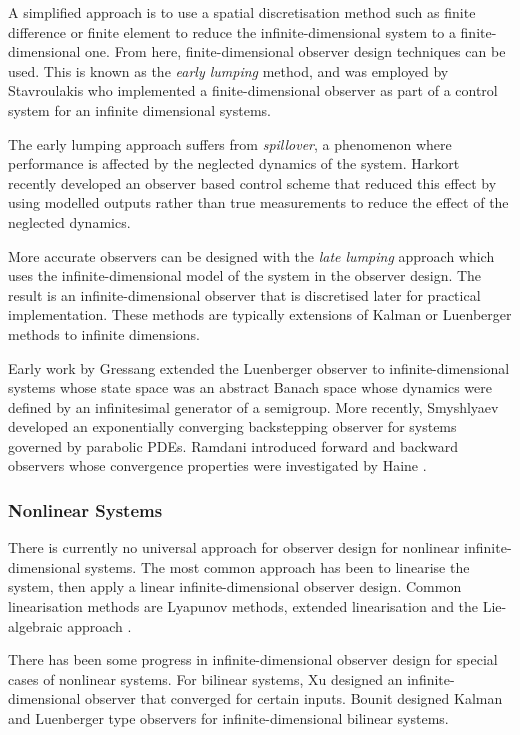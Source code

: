 A simplified approach is to use a spatial discretisation method such as finite difference or finite element to reduce the infinite-dimensional system to a finite-dimensional one. From here, finite-dimensional observer design techniques can be used. This is known as the \textit{early lumping} method, and was employed by Stavroulakis \cite{stavroulakis1973design} who implemented a finite-dimensional observer as part of a control system for an infinite dimensional systems.

The early lumping approach suffers from \textit{spillover}, a phenomenon where performance is affected by the neglected dynamics of the system\cite{meirovitch1983problem}. Harkort \cite{harkort2011finite} recently developed an observer based control scheme that reduced this effect by using modelled outputs rather than true measurements to reduce the effect of the neglected dynamics.

More accurate observers can be designed with the \textit{late lumping} approach which uses the infinite-dimensional model of the system in the observer design. The result is an infinite-dimensional observer that is discretised later for practical implementation. These methods are typically extensions of Kalman or Luenberger methods to infinite dimensions. 

Early work by Gressang \cite{gressang1975observers} extended the Luenberger observer to infinite-dimensional systems whose state space was an abstract Banach space whose dynamics were defined by an infinitesimal generator of a semigroup. More recently, Smyshlyaev \cite{smyshlyaev2005backstepping} developed an exponentially converging backstepping observer for systems governed by parabolic PDEs. Ramdani introduced forward and backward observers \cite{ramdani2010recovering} whose convergence properties were investigated by Haine \cite{haine2014recovering}.

\subsubsection{Nonlinear Systems}
There is currently no universal approach for observer design for nonlinear infinite-dimensional systems.
The most common approach has been to linearise the system, then apply a linear infinite-dimensional observer design. Common linearisation methods are Lyapunov methods, extended linearisation and the Lie-algebraic approach \cite{primbs1996survey}.

There has been some progress in infinite-dimensional observer design for special cases of nonlinear systems. For bilinear systems, Xu \cite{xu1995observer} designed an infinite-dimensional observer that converged for certain inputs. Bounit \cite{bounit1997observers} designed Kalman and Luenberger type observers for infinite-dimensional bilinear systems. 

